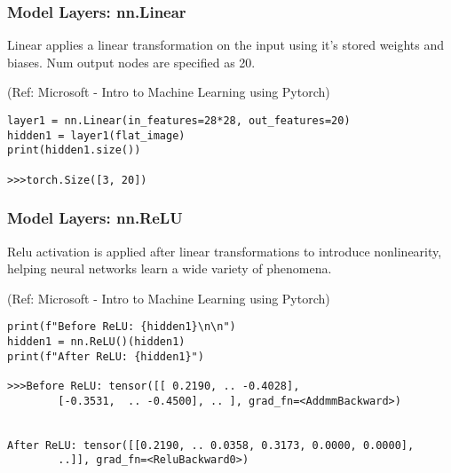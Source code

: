 \begin{frame}[fragile] \frametitle{Model Layers: nn.Linear}

Linear applies a linear transformation on the input using it's stored weights and biases. Num output nodes are specified as 20.

\tiny{(Ref: Microsoft - Intro to Machine Learning using Pytorch)}

\begin{lstlisting}
layer1 = nn.Linear(in_features=28*28, out_features=20)
hidden1 = layer1(flat_image)
print(hidden1.size())

>>>torch.Size([3, 20])
\end{lstlisting}

\end{frame}

\begin{frame}[fragile] \frametitle{Model Layers: nn.ReLU}

Relu activation is applied after linear transformations to introduce nonlinearity, helping neural networks learn a wide variety of phenomena.

\tiny{(Ref: Microsoft - Intro to Machine Learning using Pytorch)}

\begin{lstlisting}
print(f"Before ReLU: {hidden1}\n\n")
hidden1 = nn.ReLU()(hidden1)
print(f"After ReLU: {hidden1}")

>>>Before ReLU: tensor([[ 0.2190, .. -0.4028],
        [-0.3531,  .. -0.4500], .. ], grad_fn=<AddmmBackward>)


After ReLU: tensor([[0.2190, .. 0.0358, 0.3173, 0.0000, 0.0000],
        ..]], grad_fn=<ReluBackward0>)

\end{lstlisting}

\end{frame}

